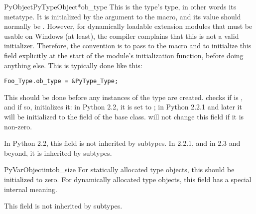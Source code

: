 \begin{cmemberdesc}{PyObject}{PyTypeObject*}{ob_type}
  This is the type's type, in other words its metatype.  It is
  initialized by the argument to the  macro,
  and its value should normally be .  However, for
  dynamically loadable extension modules that must be usable on
  Windows (at least), the compiler complains that this is not a valid
  initializer.  Therefore, the convention is to pass \NULL{} to the
   macro and to initialize this field
  explicitly at the start of the module's initialization function,
  before doing anything else.  This is typically done like this:

\begin{verbatim}
Foo_Type.ob_type = &PyType_Type;
\end{verbatim}

  This should be done before any instances of the type are created.
   checks if  is \NULL, and
  if so, initializes it: in Python 2.2, it is set to
  ; in Python 2.2.1 and later it will be
  initialized to the  field of the base class.
   will not change this field if it is
  non-zero.

  In Python 2.2, this field is not inherited by subtypes.  In 2.2.1,
  and in 2.3 and beyond, it is inherited by subtypes.
\end{cmemberdesc}

\begin{cmemberdesc}{PyVarObject}{int}{ob_size}
  For statically allocated type objects, this should be initialized
  to zero.  For dynamically allocated type objects, this field has a
  special internal meaning.

  This field is not inherited by subtypes.
\end{cmemberdesc}

